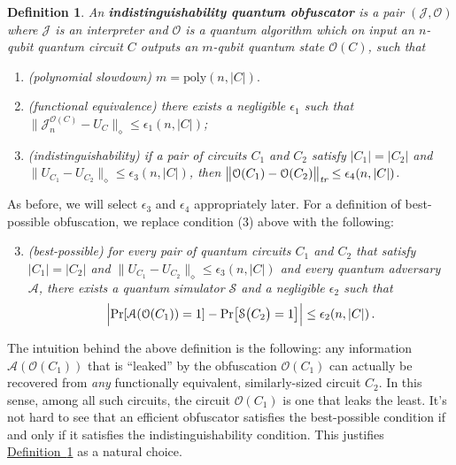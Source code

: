 \documentclass[11pt]{article}
\numberwithin{equation}{section}
\newtheorem{definition}{Definition}
\newcommand{\expref}[2]{\texorpdfstring{\hyperref[#2]{#1~\ref{#2}}}{#1~\ref{#2}}}
\begin{document}
\begin{definition}\label{def:indistinguishability}
An \textbf{indistinguishability quantum obfuscator} is a pair $(\mathcal J, \mathcal O)$ where $\mathcal J$ is an interpreter and $\mathcal O$ is a quantum algorithm which on input an $n$-qubit quantum circuit $C$ outputs an $m$-qubit quantum state $\mathcal O(C)$, such that
\begin{enumerate}
\item (polynomial slowdown) $m = \text{poly}(n, |C|).$
\item (functional equivalence) there exists a negligible $\epsilon_1$ such that $\bigl\| \mathcal J_n^{\mathcal O(C)} - U_C \bigr\|_\diamond \leq \epsilon_1(n, |C|)$;
\item (indistinguishability) if a pair of circuits $C_1$ and $C_2$ satisfy $|C_1| = |C_2|$ and $\bigl\|U_{C_1} - U_{C_2}\bigr\|_\diamond \leq \epsilon_3(n, |C|)$, then $\bigl\|\mathcal O(C_1) - \mathcal O(C_2)\bigr\|_\emph{tr} \leq \epsilon_4(n, |C|)$.
\end{enumerate}
\end{definition}
\noindent As before, we will select $\epsilon_3$ and $\epsilon_4$ appropriately later. For a definition of best-possible obfuscation, we replace condition (3) above with the following:

\begin{enumerate}
\setcounter{enumi}{2}
\item \emph{(best-possible) for every pair of quantum circuits $C_1$ and $C_2$ that satisfy $|C_1| = |C_2|$ and $\bigl\|U_{C_1} - U_{C_2}\bigr\|_\diamond \leq \epsilon_3(n, |C|)$ and every quantum adversary $\mathcal A$, there exists a quantum simulator $\mathcal S$ and a negligible $\epsilon_2$ such that}
$$
\Bigl| \text{Pr}[\mathcal A(\mathcal O(C_1)) = 1] - \text{Pr}\bigl[\mathcal S\bigl(C_2\bigr) = 1\bigr] \Bigr| \leq \epsilon_2(n, |C|)\,.
$$
\end{enumerate}

The intuition behind the above definition is the following: any information $\mathcal A(\mathcal O(C_1))$ that is ``leaked'' by the obfuscation $\mathcal O(C_1)$ can actually be recovered from \emph{any} functionally equivalent, similarly-sized circuit $C_2$. In this sense, among all such circuits, the circuit $\mathcal O(C_1)$ is one that leaks the least. It's not hard to see that an efficient obfuscator satisfies the best-possible condition if and only if it satisfies the indistinguishability condition. This justifies \expref{Definition}{def:indistinguishability} as a natural choice.
\end{document}
